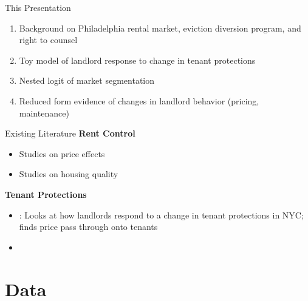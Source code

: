 \documentclass[10pt, xcolor=dvipsnames]{beamer}
\begin{document}
\begin{frame}{This Presentation}
    \begin{enumerate}
        \item Background on Philadelphia rental market, eviction diversion program, and right to counsel
        \item Toy model of landlord response to change in tenant protections
        \item Nested logit of market segmentation
        \item Reduced form evidence of changes in landlord behavior (pricing, maintenance)
    \end{enumerate}
    
\end{frame}

\begin{frame}{Existing Literature}
    \textbf{Rent Control}
    \begin{itemize}
        \item Studies on price effects \cite{diamond-2019, Jofre_Monseny_2023, Kholodilin_2024}
        \item Studies on housing quality \cite{Gyourko_1990 }
    \end{itemize}
    \textbf{Tenant Protections}
    \begin{itemize}
        \item \cite{humphries-2024}: Looks at how landlords respond to a change in tenant protections in NYC; finds price pass through onto tenants
        \item \cite{abramson_2021, Asquith_2019, Corbae_2024}
    \end{itemize}
    
\end{frame}


\section{Data}
\end{document}
